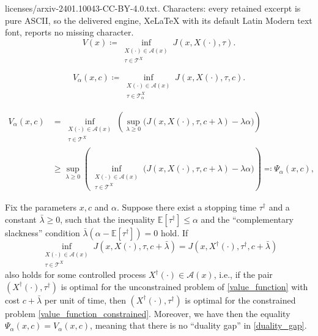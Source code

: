 \documentclass[10pt,a4paper]{amsart}
\newcommand{\ex}{\mathbb{E}}
\begin{document}
licenses/arxiv-2401.10043-CC-BY-4.0.txt. Characters: every retained excerpt is pure ASCII, so the delivered engine, XeLaTeX with its default Latin Modern text font, reports no missing character.
\begin{equation}\label{value_function}
    V(x) \coloneqq \inf\limits_{\substack{X(\cdot) \in \mathcal{A}(x) \\ \tau \in \mathcal{T}^X}} J(x, X(\cdot), \tau).
\end{equation}

\begin{equation}\label{value_function_constrained}
    V_\alpha(x, c) \coloneqq \inf\limits_{\substack{X(\cdot) \in \mathcal{A}(x) \\ \tau \in \mathcal{T}^X_\alpha}} J(x, X(\cdot), \tau, c).
\end{equation}

\begin{equation}\label{duality_gap}
    \begin{split}
        V_\alpha(x, c)
        &=
        \inf\limits_{\substack{X(\cdot) \in \mathcal{A}(x) \\ \tau \in \mathcal{T}^X}} 
        \left(
        \sup_{\lambda \ge 0}
        \Big(
            J(x, X(\cdot), \tau, c + \lambda) - \lambda \alpha 
        \Big)
        \right)
        \\&\ge
        \sup_{\lambda \ge 0}
        \left(
        \inf\limits_{\substack{X(\cdot) \in \mathcal{A}(x) \\ \tau \in \mathcal{T}^X}} 
        \Big(
            J(x, X(\cdot), \tau, c + \lambda) - \lambda \alpha 
        \Big)
        \right)
        \eqqcolon
        \Psi_\alpha(x, c),
    \end{split}
\end{equation}

\begin{Prop}\label{prop_duality_gap}
    Fix the parameters $x, c$ and $\alpha$.
    Suppose there exist a stopping time $\tau^\dag$ and a constant $\bar{\lambda} \ge 0$, such that the inequality $\ex[\tau^\dag] \le \alpha$ and the ``complementary slackness'' condition $\bar{\lambda}(\alpha - \ex[\tau^\dag]) = 0$ hold. 
    If
    \begin{equation}\label{prop_techn_equality}
        \inf\limits_{\substack{X(\cdot) \in \mathcal{A}(x) \\ \tau \in \mathcal{T}^X}}
            J\left(x, X(\cdot), \tau, c + \bar{\lambda}\right)
        =
        J\left(x, X^\dag(\cdot), \tau^\dag, c + \bar{\lambda}\right)
    \end{equation}
    also holds for some controlled process $X^\dag(\cdot) \in \mathcal{A}(x)$, i.e., if the pair $\left(X^\dag(\cdot), \tau^\dag\right)$ is optimal for the unconstrained problem of \eqref{value_function} with cost $c + \bar{\lambda}$ per unit of time, then $\left(X^\dag(\cdot), \tau^\dag\right)$ is optimal for the constrained problem \eqref{value_function_constrained}. Moreover, we have then the equality $\Psi_\alpha(x, c) = V_\alpha(x, c)$, meaning that there is no ``duality gap'' in \eqref{duality_gap}.
\end{Prop}
\end{document}
